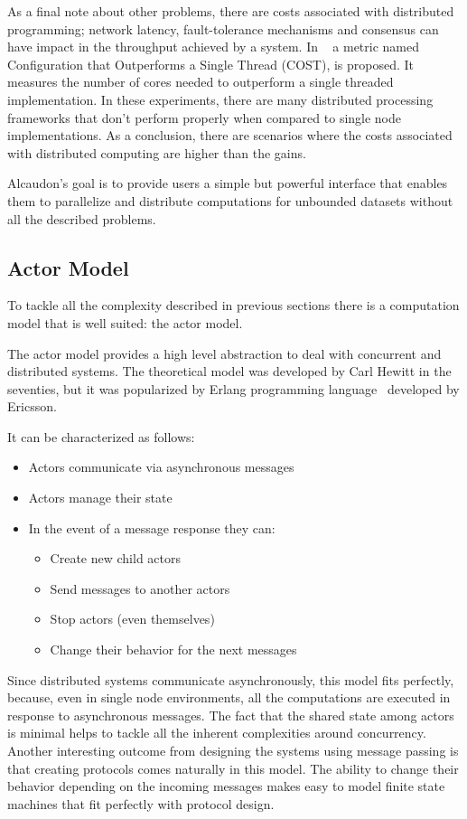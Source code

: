 As a final note about other problems, there are costs associated with
distributed programming; network latency, fault-tolerance mechanisms and
consensus can have impact in the throughput achieved by a system. In
~\cite{189908} a metric named Configuration that Outperforms a Single Thread
(COST), is proposed. It measures the number of cores needed to outperform a
single threaded implementation. In these experiments, there are many distributed
processing frameworks that don't perform properly when compared to single node
implementations. As a conclusion, there are scenarios where the costs associated
with distributed computing are higher than the gains.

Alcaudon's goal is to provide users a simple but powerful interface that enables
them to parallelize and distribute computations for unbounded datasets without all
the described problems.

\subsection{Actor Model}

To tackle all the complexity described in previous sections there is a
computation model that is well suited: the actor model.

The actor model provides a high level abstraction to deal with concurrent and
distributed systems. The theoretical model was developed by Carl Hewitt in
the seventies, but it was popularized by Erlang programming language~\cite{erlang}
developed by Ericsson.

It can be characterized as follows:
\begin{itemize}
\item Actors communicate via asynchronous messages
\item Actors manage their state
\item In the event of a message response they can:
  \begin{itemize}
  \item Create new child actors
  \item Send messages to another actors
  \item Stop actors (even themselves)
  \item Change their behavior for the next messages
  \end{itemize}
\end{itemize}

Since distributed systems communicate asynchronously, this model fits perfectly,
because, even in single node environments, all the computations are executed in
response to asynchronous messages. The fact that the shared state among actors
is minimal helps to tackle all the inherent complexities around concurrency.
Another interesting outcome from designing the systems using message passing is
that creating protocols comes naturally in this model. The ability to change
their behavior depending on the incoming messages makes easy to model finite
state machines that fit perfectly with protocol design.

